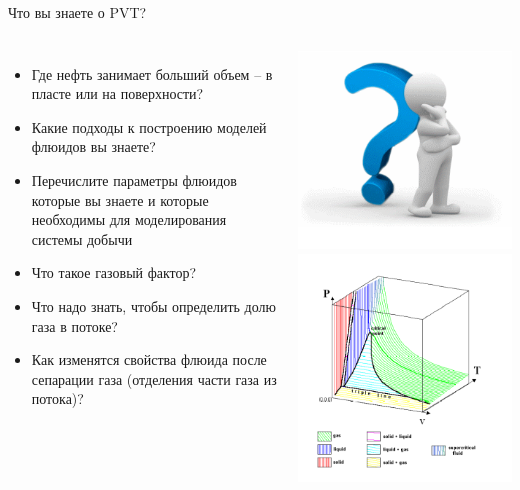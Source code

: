 \begin{frame}{Что вы знаете о PVT?}
\begin{columns}
    \begin{itemize}
        \item Где нефть занимает больший объем – в пласте или на поверхности?
        \item Какие подходы к построению моделей флюидов вы знаете?
        \item Перечислите параметры флюидов которые вы знаете и которые необходимы для моделирования системы добычи
        \item Что такое газовый фактор?
        \item Что надо знать, чтобы определить долю газа в потоке?
        \item Как изменятся свойства флюида после сепарации газа (отделения части газа из потока)?  
    \end{itemize}
    \includegraphics[scale=0.3]{fig/question_pic.png}
    \newline
    \includegraphics[scale=0.3]{fig/PVT.png}
\end{columns}
\end{frame}



